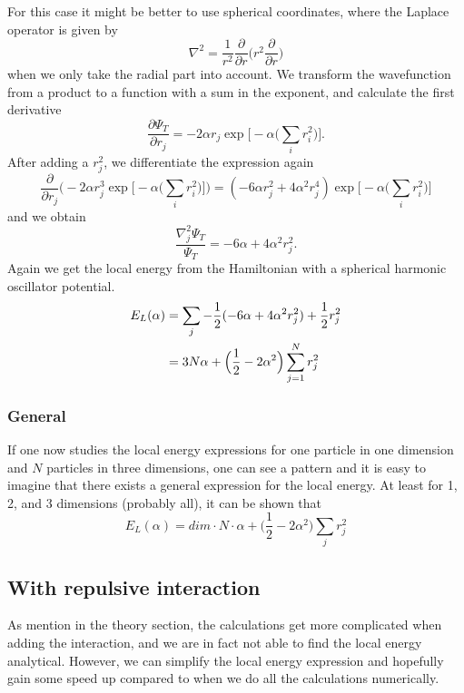 \documentclass[norsk,a4paper,12pt]{article}
\begin{document}
For this case it might be better to use spherical coordinates, where the Laplace operator is given by
\begin{equation}
\nabla^2=\frac{1}{r^2}\frac{\partial}{\partial r}\bigg(r^2\frac{\partial}{\partial r}\bigg)
\end{equation}
when we only take the radial part into account. We transform the wavefunction from a product to a function with a sum in the exponent, and calculate the first derivative
\begin{equation}
\frac{\partial\Psi_T}{\partial r_j}=-2\alpha r_j \exp\bigg[-\alpha\bigg(\sum_i r_i^2\bigg)\bigg].
\end{equation}
After adding a $r_j^2$, we differentiate the expression again
\begin{equation*}
\frac{\partial}{\partial r_j}\bigg(-2\alpha r_j^3\exp\Big[-\alpha\Big(\sum_i r_i^2\Big)\Big]\bigg)
=(-6\alpha r_j^2 + 4\alpha^2r_j^4)\exp\Big[-\alpha\Big(\sum_i r_i^2\Big)\Big]
\end{equation*}
and we obtain
\begin{equation}
\frac{\nabla_j^2\Psi_T}{\Psi_T}=-6\alpha+4\alpha^2r_j^2.
\end{equation}
Again we get the local energy from the Hamiltonian with a spherical harmonic oscillator potential. 
\begin{align}
E_L(\alpha)&=\sum_j-\frac{1}{2}(-6\alpha+4\alpha^2r_j^2) + \frac{1}{2}r_j^2\notag\\
&=3N\alpha + \Big(\frac{1}{2}-2\alpha^2\Big)\sum_{j=1}^Nr_j^2
\end{align}

\subsubsection{General}
If one now studies the local energy expressions for one particle in one dimension and $N$ particles in three dimensions, one can see a pattern and it is easy to imagine that there exists a general expression for the local energy. At least for 1, 2, and 3 dimensions (probably all), it can be shown that
\begin{equation}
E_L(\alpha)=dim\cdot N\cdot \alpha+\Big(\frac{1}{2}-2\alpha^2\Big)\sum_jr_j^2
\end{equation}

\subsection{With repulsive interaction}
As mention in the theory section, the calculations get more complicated when adding the interaction, and we are in fact not able to find the local energy analytical. However, we can simplify the local energy expression and hopefully gain some speed up compared to when we do all the calculations numerically. 
\end{document}
